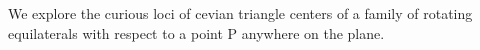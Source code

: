 We explore the curious loci of cevian triangle centers of a family of rotating equilaterals with respect to a point P anywhere on the plane.